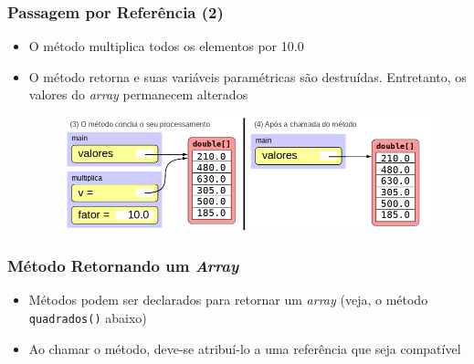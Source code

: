 \documentclass[xcolor={dvipsnames,table},aspectratio=169]{beamer}
\begin{document}
\begin{frame}\frametitle{Passagem por Referência (2)}
\begin{itemize}
	\item O método multiplica todos os elementos por 10.0
	\item O método retorna e suas variáveis paramétricas são destruídas. Entretanto, os valores do \emph{array} permanecem alterados
\begin{figure}[h]
	\includegraphics[height=0.4\paperheight,center]{pucrs-ep-fprog-unidade_06-arrays-laminas-passagem_por_referencia_2.png}
\end{figure}
\end{itemize}
\end{frame}

\begin{frame}[fragile]\frametitle{Método Retornando um \emph{Array}}
\begin{itemize}
	\item Métodos podem ser declarados para retornar um \emph{array} (veja, o método \texttt{quadrados()} abaixo)
	\item Ao chamar o método, deve-se atribuí-lo a uma referência que seja compatível
{\tiny\inputminted[bgcolor=cyan!10]{java}{src/Quadrados.java}}
\end{itemize}
\end{frame}
\end{document}
